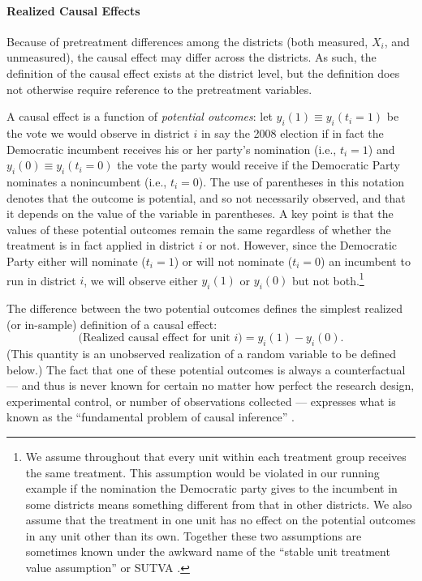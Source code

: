 \documentclass[11pt,titlepage]{article}
\begin{document}
\paragraph{Realized Causal Effects}
Because of pretreatment differences among the districts (both
measured, $X_i$, and unmeasured), the causal effect may differ across
the districts.  As such, the definition of the causal effect exists at
the district level, but the definition does not otherwise require
reference to the pretreatment variables.

A causal effect is a function of \emph{potential outcomes}: let
$y_i(1)\equiv y_i(t_i=1)$ be the vote we would observe in district $i$
in say the 2008 election if in fact the Democratic incumbent receives
his or her party's nomination (i.e., $t_i=1$) and $y_i(0)\equiv
y_i(t_i=0)$ the vote the party would receive if the Democratic Party
nominates a nonincumbent (i.e., $t_i=0$).  The use of parentheses in
this notation denotes that the outcome is potential, and so not
necessarily observed, and that it depends on the value of the variable
in parentheses.  A key point is that the values of these potential
outcomes remain the same regardless of whether the treatment is in
fact applied in district $i$ or not.  However, since the Democratic
Party either will nominate ($t_i=1$) or will not nominate ($t_i=0$) an
incumbent to run in district $i$, we will observe either $y_{i}(1)$ or
$y_{i}(0)$ but not both.\footnote{We assume throughout that every unit
  within each treatment group receives the same treatment.  This
  assumption would be violated in our running example if the
  nomination the Democratic party gives to the incumbent in some
  districts means something different from that in other districts.
  We also assume that the treatment in one unit has no effect on the
  potential outcomes in any unit other than its own.  Together these
  two assumptions are sometimes known under the awkward name of the
  ``stable unit treatment value assumption'' or SUTVA
  \citep{Rubin74}.}

The difference between the two potential outcomes defines the simplest
realized (or in-sample) definition of a causal effect:
\begin{equation}
  \label{rce}
  \text{(Realized causal effect for unit $i$)} = y_i(1) - y_i(0).
\end{equation}
(This quantity is an unobserved realization of a random variable to be
defined below.)  The fact that one of these potential outcomes is
always a counterfactual --- and thus is never known for certain no
matter how perfect the research design, experimental control, or
number of observations collected --- expresses what is known as the
``fundamental problem of causal inference'' \citep{Holland86}.
\end{document}
